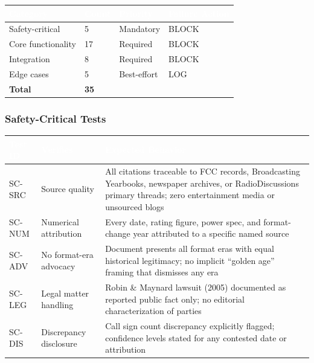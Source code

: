 \documentclass[11pt,letterpaper]{article}
\newcommand{\tableheader}[1]{\textbf{\sffamily\textcolor{white}{#1}}}
\begin{document}
\begin{center}
\begin{tabularx}{\textwidth}{L{3cm}C{1.5cm}L{2cm}C{2cm}}
\toprule
{}
\tableheader{Category} & \tableheader{Count} & \tableheader{Priority} & \tableheader{Failure Action} \\
\midrule
Safety-critical & 5 & Mandatory & BLOCK \\
Core functionality & 17 & Required & BLOCK \\
Integration & 8 & Required & BLOCK \\
Edge cases & 5 & Best-effort & LOG \\
\midrule
\textbf{Total} & \textbf{35} & & \\
\bottomrule
\end{tabularx}
\end{center}

\subsubsection{Safety-Critical Tests}

\begin{center}
\begin{tabularx}{\textwidth}{L{1.5cm}L{3cm}X}
\toprule
{}
\tableheader{Test ID} & \tableheader{Verifies} & \tableheader{Expected Behavior} \\
\midrule
SC-SRC & Source quality & All citations traceable to FCC records, Broadcasting Yearbooks, newspaper archives, or RadioDiscussions primary threads; zero entertainment media or unsourced blogs \\
SC-NUM & Numerical attribution & Every date, rating figure, power spec, and format-change year attributed to a specific named source \\
SC-ADV & No format-era advocacy & Document presents all format eras with equal historical legitimacy; no implicit ``golden age'' framing that dismisses any era \\
SC-LEG & Legal matter handling & Robin \& Maynard lawsuit (2005) documented as reported public fact only; no editorial characterization of parties \\
SC-DIS & Discrepancy disclosure & Call sign count discrepancy explicitly flagged; confidence levels stated for any contested date or attribution \\
\bottomrule
\end{tabularx}
\end{center}
\end{document}
